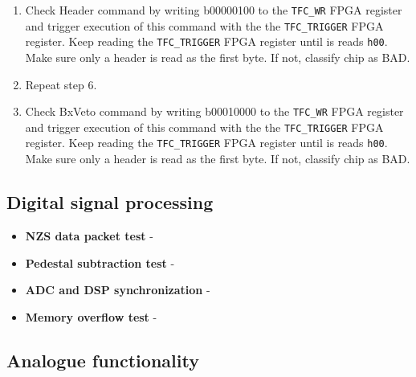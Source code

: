 \documentclass{lhcbnote}
\begin{document}
\begin{itemize}
\begin{enumerate}
\item Check Header command by writing b00000100 to the \texttt{TFC\_WR} FPGA register and trigger execution of this command with the the \texttt{TFC\_TRIGGER} FPGA register. Keep reading the \texttt{TFC\_TRIGGER} FPGA register until is reads \texttt{h00}. Make sure only a header is read as the first byte. If not, classify chip as BAD.
\item Repeat step 6.
\item Check BxVeto command by writing b00010000 to the \texttt{TFC\_WR} FPGA register and trigger execution of this command with the the \texttt{TFC\_TRIGGER} FPGA register. Keep reading the \texttt{TFC\_TRIGGER} FPGA register until is reads \texttt{h00}. Make sure only a header is read as the first byte. If not, classify chip as BAD.
\end{enumerate}
\end{itemize}

\subsection{Digital signal processing}
\begin{itemize}
\item \textbf{NZS data packet test} - 
\item \textbf{Pedestal subtraction test} -
\item \textbf{ADC and DSP synchronization} - 
\item \textbf{Memory overflow test} -
\end{itemize}

\subsection{Analogue functionality}
\end{document}
